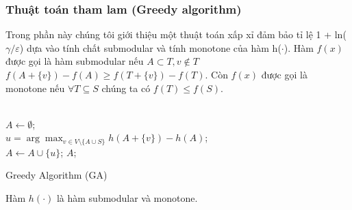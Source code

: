 \subsubsection{Thuật toán tham lam (Greedy algorithm)}
Trong phần này chúng tôi giới thiệu một thuật toán xấp xỉ đảm bảo tỉ lệ 1 + ln($\gamma / \varepsilon$) dựa vào tính chất submodular và tính monotone của hàm h($\cdot$). Hàm $f(x)$ được gọi là hàm submodular nếu $A \subset T, v \notin T$ $ f(A+ \{v\})- f(A) \geq f(T+ \{v\})- f(T)$. Còn $f(x)$ được gọi là monotone nếu $\forall T \subseteq S$ chúng ta có $f(T) \leq f(S)$.
\\
\\
\begin{algorithm}[H]			
	$A \leftarrow \emptyset$;
	\\
	{ 	
		$u=\arg \max_{v \in V\setminus \{A \cup S\}} {h(A+ \{v\})- h(A)}$; 
		\\
		$A \leftarrow A \cup \{u\}$;
	}
	\Return $A$;
	\caption{Greedy Algorithm (GA)}
	\label{GA}
\end{algorithm}
\begin{theo}					
	Hàm $h(\cdot)$ là hàm submodular và monotone. 
	\label{sub}
\end{theo}	

